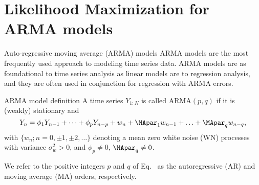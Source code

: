 \documentclass[aspectratio=169]{beamer}\usepackage[]{graphicx}\usepackage[]{xcolor}
\begin{document}
\section{Likelihood Maximization for ARMA models}

\begin{frame}{Auto-regressive moving average (ARMA) models}
  ARMA models are the most frequently used approach to modeling time series data.
  ARMA models are as foundational to time series analysis as linear models are to regression analysis, and they are often used in conjunction for regression with ARMA errors.
  
  \begin{block}{ARMA model definition}
    A time series $Y_{1:N}$ is called ARMA$(p, q)$ if it is (weakly) stationary and
    \begin{equation}
    Y_n = \phi_1Y_{n - 1} + \cdots + \phi_pY_{n - p} + w_n + \MApar_1w_{n-1} + \ldots + \MApar_qw_{n - q},\label{eq:arma}
    \end{equation}
    with $\{w_n; n = 0, \pm1, \pm2, \ldots\}$ denoting a mean zero white noise (WN) processes with variance $\sigma_w^2 > 0$, and $\phi_p \neq 0$, $\MApar_q \neq 0$.
  \end{block}
  
  We refer to the positive integers $p$ and $q$ of Eq.~ as the autoregressive (AR) and moving average (MA) orders, respectively.
\end{frame}
\end{document}

